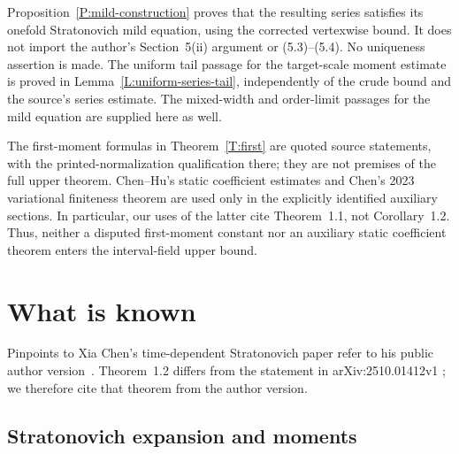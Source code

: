 \documentclass[12pt,oneside,openany]{book}
\numberwithin{equation}{section}
\theoremstyle{nogostyle}
\theoremstyle{definition}
\begin{document}
Proposition~\ref{P:mild-construction} proves that the resulting series satisfies
its onefold Stratonovich mild equation, using the corrected vertexwise bound. It
does not import the author's Section~5(ii) argument or (5.3)--(5.4). No
uniqueness assertion is made. The uniform tail passage for the target-scale
moment estimate is proved in Lemma~\ref{L:uniform-series-tail}, independently of
the crude bound and the source's series estimate. The mixed-width and
order-limit passages for the mild equation are supplied here as well.

The first-moment formulas in Theorem~\ref{T:first} are quoted source statements,
with the printed-normalization qualification there; they are not premises of the
full upper theorem. Chen--Hu's static coefficient estimates and Chen's 2023
variational finiteness theorem are used only in the explicitly identified
auxiliary sections. In particular, our uses of the latter cite Theorem~1.1, not
Corollary~1.2. Thus, neither a disputed first-moment constant nor an auxiliary
static coefficient theorem enters the interval-field upper bound.



\section{What is known}\label{S:known}

Pinpoints to Xia Chen's time-dependent Stratonovich paper refer to his
public author version~\cite{chen:author2026:time-dependency}.
Theorem~1.2 differs from the statement in arXiv:2510.01412v1
\cite{chen:25:time-dependency}; we therefore cite that theorem from the
author version.

\subsection{Stratonovich expansion and moments}
\end{document}
